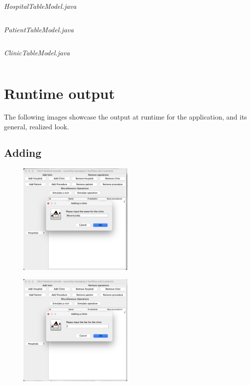 \documentclass{article}
\begin{document}
\textit{HospitalTableModel.java}
\inputminted{java}{./src/main/java/com/yvesstraten/medicalconsolegui/models/HospitalTableModel.java}

\textit{PatientTableModel.java}
\inputminted{java}{./src/main/java/com/yvesstraten/medicalconsolegui/models/PatientTableModel.java}

\textit{ClinicTableModel.java}
\inputminted{java}{./src/main/java/com/yvesstraten/medicalconsolegui/models/ClinicTableModel.java}

\newpage 

\section{Runtime output}\label{sec:runtime_output} %
The following images showcase the output at runtime for the application, and its general, realized look.

\subsection{Adding}\label{sub:adding} %
\begin{figure}
  \begin{center}
    \includegraphics[width=0.5\textwidth]{./figures/Add/Clinic_1.png}
  \end{center}
\end{figure}

\begin{figure}
  \begin{center}
    \includegraphics[width=0.5\textwidth]{./figures/Add/Clinic_2.png}
  \end{center}
\end{figure}
\end{document}
